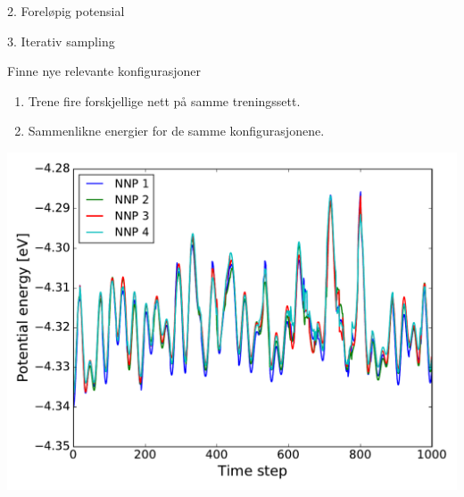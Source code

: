 \documentclass{beamer}
\begin{document}
\begin{frame}{2. Foreløpig potensial}
\end{frame}


\begin{frame}{3. Iterativ sampling}

\begin{block}{Finne nye relevante konfigurasjoner}
 \begin{enumerate}
  \item Trene fire forskjellige nett på samme treningssett. 
  \item Sammenlikne energier for de samme konfigurasjonene. 
 \end{enumerate}

 \centering
 \includegraphics[width = 0.7\linewidth]{../Figures/Results/multipleNNP.pdf}
\end{block}

\end{frame}

\end{document}
